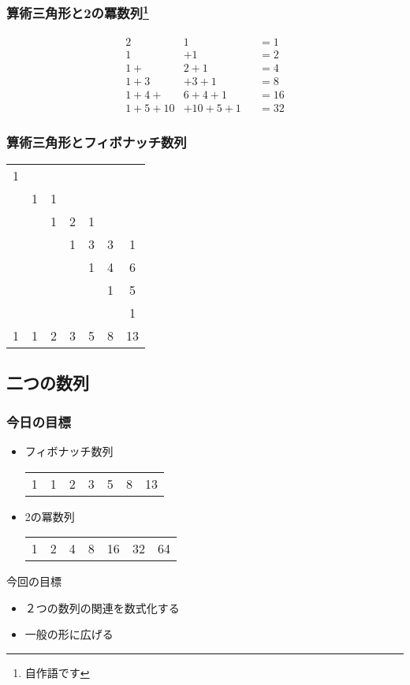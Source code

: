 \documentclass[dvipdfmx,12pt]{beamer}
\begin{document}
\begin{frame}
\frametitle{算術三角形と2の冪数列\footnote{自作語です}}
\begin{alignat*}{2}
&1& &=1\\
1&+1& &=2\\
1+&2+1& &=4\\
1+3&+3+1& &=8\\
1+4+&6+4+1& &=16\\
1+5+10&+10+5+1& &=32
\end{alignat*}
\end{frame}

\begin{frame}
\frametitle{算術三角形とフィボナッチ数列}
\begin{table}
\begin{tabular}{ccccccc}
1&\multicolumn{6}{c}{}\\
&1&1&\multicolumn{4}{c}{}\\
&&1&2&1&&\\
&&&1&3&3&1\\
&&&&1&4&6\\
&&&&&1&5\\
&&&&&&1 \\ \hline
1&1&2&3&5&8&13
\end{tabular}
\end{table}
\end{frame}

\subsection{二つの数列}
\begin{frame}
\frametitle{今日の目標}
\begin{itemize}
\item{
フィボナッチ数列
\begin{table}
\raggedright
\begin{tabular}{ccccccc}
1&1&2&3&5&8&13
\end{tabular}
\end{table}
}
\item{
2の冪数列
\begin{table}
\raggedright
\begin{tabular}{ccccccc}
1&2&4&8&16&32&64
\end{tabular}
\end{table}
}
\end{itemize}
今回の目標
\begin{itemize}
\item ２つの数列の関連を数式化する
\item 一般の形に広げる
\end{itemize}
\end{frame}
\end{document}
